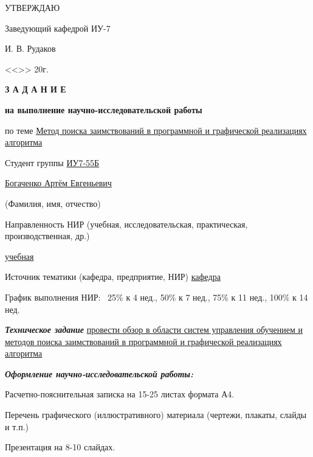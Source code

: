 \vspace*{-1.3cm}

\begin{flushright}
	\fontsize{12pt}{0.6cm}\selectfont
	УТВЕРЖДАЮ
	
	Заведующий кафедрой ИУ-7
	
	\uline{\mbox{\hspace{3cm}}} И. В. Рудаков
	
	<<\uline{\mbox{\hspace{1cm}}}>> \uline{\mbox{\hspace{3cm}}} 20\uline{\mbox{\hspace{1cm}}}г.
\end{flushright}

\begin{center}
	\fontsize{20pt}{14pt}\selectfont

	\textbf{З А Д А Н И Е}
	
	\textbf{на выполнение научно-исследовательской работы}
\end{center}

\begin{flushleft}
	\fontsize{12pt}{0.6cm}\selectfont
	
	по теме \uline{\hfill Метод поиска заимствований в программной и графической реализациях алгоритма\hfill}
	
	Студент группы \uline{ИУ7-55Б}
	
	\centerline{\uline{\hfill Богаченко Артём Евгеньевич \hfill}}
	\scriptsize\mbox{\hspace{7cm}}(Фамилия, имя, отчество)
	
	\fontsize{12pt}{0.6cm}\selectfont
	
	Направленность НИР (учебная, исследовательская, практическая, производственная, др.)\hfill\centerline{\uline{\hfill учебная \hfill}}
	
	Источник тематики (кафедра, предприятие, НИР) {\uline{\hfill кафедра \hfill}}
	
	График выполнения НИР: ~25\% к 4 нед., 50\% к 7 нед., 75\% к 11 нед., 100\% к 14 нед.
	
	\textit{\bfseries{Техническое задание}} \uline{\hfill провести обзор в области систем управления обучением и методов поиска заимствований в программной и графической реализациях алгоритма\hfill}
	
	\addvspace{12pt}
	
	\textit{\bfseries{Оформление научно-исследовательской работы:}}

	\addvspace{12pt}
	\fontsize{12pt}{0.1cm}\selectfont
	Расчетно-пояснительная записка на 15-25 листах формата А4.
	
	Перечень графического (иллюстративного) материала (чертежи, плакаты, слайды и т.п.)
	
	Презентация на 8-10 слайдах.
	
\end{flushleft}

